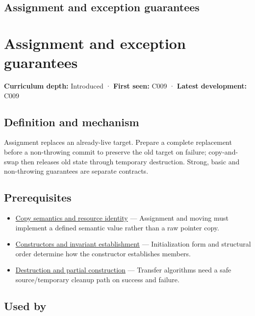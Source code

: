 \hypertarget{appendix-bea6beb5350f}{}
\section*{Assignment and exception guarantees}
\chapter{Assignment and exception guarantees}\label{appendix-bea6beb5350f-assignment-and-exception-guarantees}

\textbf{Curriculum depth:} Introduced · \textbf{First seen:} C009 · \textbf{Latest development:} C009

\section{Definition and mechanism}\label{appendix-bea6beb5350f-definition-and-mechanism}

Assignment replaces an already-live target. Prepare a complete replacement before a non-throwing commit to preserve the old target on failure; copy-and-swap then releases old state through temporary destruction. Strong, basic and non-throwing guarantees are separate contracts.

\section{Prerequisites}\label{appendix-bea6beb5350f-prerequisites}

\begin{itemize}
\tightlist
\item
  \hyperref[appendix-1340cd1ce582]{Copy semantics and resource identity} --- Assignment and moving must implement a defined semantic value rather than a raw pointer copy.
\item
  \hyperref[appendix-7f8ec83d0886]{Constructors and invariant establishment} --- Initialization form and structural order determine how the constructor establishes members.
\item
  \hyperref[appendix-9bfe377cef7a]{Destruction and partial construction} --- Transfer algorithms need a safe source/temporary cleanup path on success and failure.
\end{itemize}

\section{Used by}\label{appendix-bea6beb5350f-used-by}

